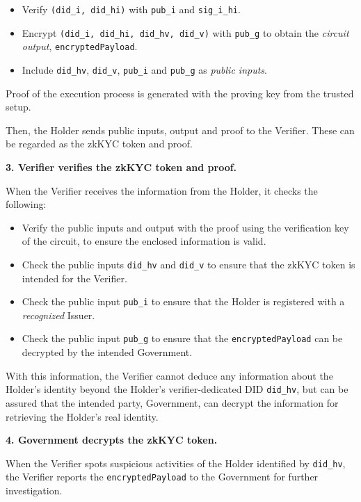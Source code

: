 \documentclass[
]{report}
\providecommand{\tightlist}{%
  \setlength{\itemsep}{0pt}\setlength{\parskip}{0pt}}
\begin{document}
\begin{itemize}
\tightlist
\item
  Verify \texttt{(did\_i,\ did\_hi)} with \texttt{pub\_i} and
  \texttt{sig\_i\_hi}.
\item
  Encrypt \texttt{(did\_i,\ did\_hi,\ did\_hv,\ did\_v)} with
  \texttt{pub\_g} to obtain the \emph{circuit output},
  \texttt{encryptedPayload}.
\item
  Include \texttt{did\_hv}, \texttt{did\_v}, \texttt{pub\_i} and
  \texttt{pub\_g} as \emph{public inputs}.
\end{itemize}

Proof of the execution process is generated with the proving key from
the trusted setup.

Then, the Holder sends public inputs, output and proof to the Verifier.
These can be regarded as the zkKYC token and proof.

\textbf{3. Verifier verifies the zkKYC token and proof.}

When the Verifier receives the information from the Holder, it checks
the following:

\begin{itemize}
\tightlist
\item
  Verify the public inputs and output with the proof using the
  verification key of the circuit, to ensure the enclosed information is
  valid.
\item
  Check the public inputs \texttt{did\_hv} and \texttt{did\_v} to ensure
  that the zkKYC token is intended for the Verifier.
\item
  Check the public input \texttt{pub\_i} to ensure that the Holder is
  registered with a \emph{recognized} Issuer.
\item
  Check the public input \texttt{pub\_g} to ensure that the
  \texttt{encryptedPayload} can be decrypted by the intended Government.
\end{itemize}

With this information, the Verifier cannot deduce any information about
the Holder's identity beyond the Holder's verifier-dedicated DID
\texttt{did\_hv}, but can be assured that the intended party,
Government, can decrypt the information for retrieving the Holder's real
identity.

\textbf{4. Government decrypts the zkKYC token.}

When the Verifier spots suspicious activities of the Holder identified
by \texttt{did\_hv}, the Verifier reports the \texttt{encryptedPayload}
to the Government for further investigation.
\end{document}

